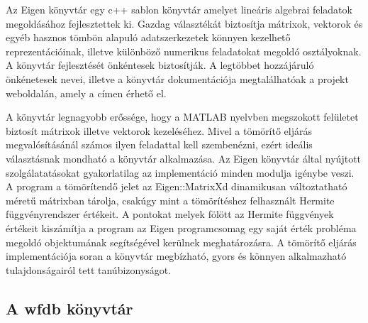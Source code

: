 \documentclass[oneside,titlepage,12pt,a4paper]{report}
\begin{document}
Az Eigen könyvtár egy c++ sablon könyvtár amelyet lineáris algebrai feladatok megoldásához fejlesztettek ki. Gazdag választékát biztosítja mátrixok, vektorok és egyéb hasznos tömbön alapuló adatszerkezetek könnyen kezelhető reprezentációinak, illetve különböző numerikus feladatokat megoldó osztályoknak. A könyvtár fejlesztését önkéntesek biztosítják. A legtöbbet hozzájáruló önkénetesek nevei, illetve a könyvtár dokumentációja megtalálhatóak a projekt weboldalán, amely a \cite{eigenEler} címen érhető el.
\par A könyvtár legnagyobb erőssége, hogy a MATLAB nyelvben megszokott felületet biztosít mátrixok illetve vektorok kezeléséhez. Mivel a tömörítő eljárás megvalósításánál számos ilyen feladattal kell szembenézni, ezért ideális választásnak mondható a könyvtár alkalmazása. Az Eigen könyvtár által nyújtott szolgálatatásokat gyakorlatilag az implementáció minden modulja igénybe veszi. A program a tömörítendő jelet az Eigen::MatrixXd dinamikusan változtatható méretű mátrixban tárolja, csakúgy mint a tömörítéshez felhasznált Hermite függvényrendszer értékeit. A pontokat melyek fölött az Hermite függvények értékeit kiszámítja a program az Eigen programcsomag egy saját érték probléma megoldó objektumának segítségével kerülnek meghatározásra. A tömörítő eljárás implementációja soran a könyvtár megbízható, gyors és könnyen alkalmazható tulajdonságairól tett tanúbizonyságot.

\subsection*{A wfdb könyvtár} 
\end{document}
